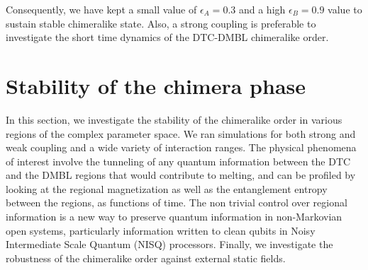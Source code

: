 \documentclass[12pt]{iopart}
\begin{document}
Consequently, we have kept a small value of $\epsilon_A = 0.3$ and a high $\epsilon_B = 0.9$ value to sustain stable chimeralike state. Also, a strong coupling is preferable to investigate the short time dynamics of the DTC-DMBL chimeralike order.

\section{\label{sec:level4} Stability of the chimera phase}
In this section, we investigate the stability of the chimeralike order in various regions of the complex parameter space. We ran simulations for both strong and weak coupling and a wide variety of interaction ranges. The physical phenomena of interest involve the tunneling of any quantum information between the DTC and the DMBL regions that would contribute to melting, and can be profiled by looking at the regional magnetization as well as the entanglement entropy between the regions, as functions of time. The non trivial control over regional information is a new way to preserve quantum information in non-Markovian open systems, particularly information written to  clean qubits in Noisy Intermediate Scale Quantum (NISQ) processors. Finally, we investigate the robustness of the chimeralike order against external static fields.
\end{document}
